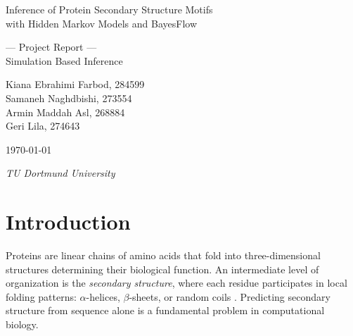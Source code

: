 \documentclass[12pt]{article}
\begin{document}
\begin{titlepage}
        \centering %
        \vspace*{\baselineskip} %
        
        {\huge Inference of Protein Secondary Structure Motifs\\[0.1\baselineskip]
         with Hidden Markov Models and BayesFlow}\\[0.2\baselineskip]
        
        
        \vspace*{\baselineskip}
        
        {\Large --- Project Report ---\\
          Simulation Based Inference\\[\baselineskip]} %
        \vspace*{\baselineskip}
        

        {\LARGE 
            Kiana Ebrahimi Farbod, 284599\\[10pt]
            Samaneh Naghdbishi, 273554\\[10pt]
            Armin Maddah Asl, 268884\\[10pt]
            Geri Lila, 274643\\[10pt]
        } %
        
        \vfill

        \today \par %
        
        \vspace*{\baselineskip}

        {\itshape TU Dortmund University\par}
    \end{titlepage}

\clearpage

\tableofcontents

\clearpage

\section{Introduction}

Proteins are linear chains of amino acids that fold into three-dimensional structures
determining their biological function. An intermediate level of organization is the
\textit{secondary structure}, where each residue participates in local folding
patterns: $\alpha$-helices, $\beta$-sheets, or random coils \parencite{bioninja}.
Predicting secondary structure from sequence alone is a fundamental problem in
computational biology.
\end{document}
